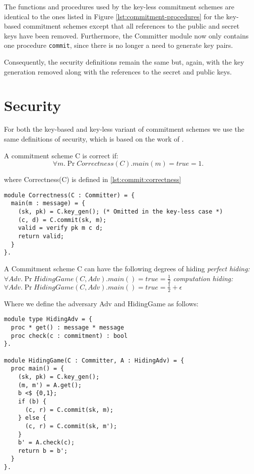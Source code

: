 The functions and procedures used by the key-less commitment schemes are
identical to the ones listed in Figure \ref{lst:commitment-procedures} for the
key-based commitment schemes except that all references to
the public and secret keys have been removed. Furthermore, the Committer module
now only contains one procedure \texttt{commit}, since there is no longer a need
to generate key pairs.

Consequently, the security definitions remain the same but, again, with the key
generation removed along with the references to the secret and public keys.

\section{Security}
\label{sec:commitment:sec}
For both the key-based and key-less variant of commitment schemes we use the
same definitions of security, which is based on the work of
\cite{DBLP:journals/corr/MetereD17}.

\begin{definition}[Correctness]
  \label{def:commitment:correctness}
  A commitment scheme C is correct if:
  \[
    \forall m. \Pr{ Correctness(C).main(m) = true } = 1.
  \]

  where Correctness(C) is defined in \autoref{lst:commit:correctness}

\begin{lstlisting}[float,label=lst:commit:correctness, caption=Correctness Game]
module Correctness(C : Committer) = {
  main(m : message) = {
    (sk, pk) = C.key_gen(); (* Omitted in the key-less case *)
    (c, d) = C.commit(sk, m);
    valid = verify pk m c d;
    return valid;
  }
}.
\end{lstlisting}


\end{definition}

\begin{definition}[Hiding]
  A Commitment scheme C can have the following degrees of hiding
  \label{def:commitment:hiding}
  \textit{perfect hiding:} $\forall Adv. \Pr{HidingGame(C,Adv).main() = true} = \frac{1}{2}$
  \textit{computation hiding:} $\forall Adv. \Pr{HidingGame(C,Adv).main() = true} = \frac{1}{2} + \epsilon$

  Where we define the adversary Adv and HidingGame as follows:
\begin{lstlisting}
module type HidingAdv = {
  proc * get() : message * message
  proc check(c : commitment) : bool
}.

module HidingGame(C : Committer, A : HidingAdv) = {
  proc main() = {
    (sk, pk) = C.key_gen();
    (m, m') = A.get();
    b <$ {0,1};
    if (b) {
      (c, r) = C.commit(sk, m);
    } else {
      (c, r) = C.commit(sk, m');
    }
    b' = A.check(c);
    return b = b';
  }
}.
\end{lstlisting}
\end{definition}

